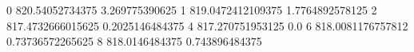 0 820.54052734375 3.269775390625
1 819.0472412109375 1.7764892578125
2 817.4732666015625 0.2025146484375
4 817.270751953125 0.0
6 818.0081176757812 0.73736572265625
8 818.0146484375 0.743896484375
